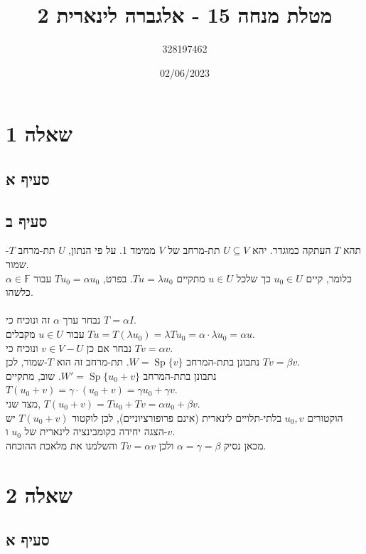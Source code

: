 \documentclass{article}
\title{מטלת מנחה 15 - אלגברה לינארית 2}
\author{328197462}
\date{02/06/2023}
\def\field{\mathbb{F}}
\DeclareMathOperator{\Sp}{Sp}
\begin{document}
\maketitle

\section*{שאלה 1}

\subsection*{סעיף א}

\subsection*{סעיף ב}

תהא $T$ העתקה כמוגדר.
יהא $U\subseteq V$ תת-מרחב של $V$ ממימד 1. על פי הנתון, $U$ תת-מרחב $T$-שמור. \\
כלומר, קיים $u_0\in U$ כך שלכל $u\in U$ מתקיים $Tu=\lambda u_0$. בפרט, $Tu_0=\alpha u_0$ עבור $\alpha\in \field$ כלשהו.\\\\
נבחר ערך $\alpha$ זה ונוכיח כי $T=\alpha I$. \\
עבור $u\in U$ מקבלים $Tu=T(\lambda u_0)= \lambda Tu_0 = \alpha \cdot \lambda u_0=\alpha u$. \\
נבחר אם כן $v\in V - U$ ונוכיח כי $Tv=\alpha v$. \\
נתבונן בתת-המרחב $W=\Sp\{v\}$. תת-מרחב זה הוא $T$-שמור, לכן $Tv=\beta v$. \\
נתבונן בתת-המרחב $W'=\Sp\{ u_0+v \}$. שוב, מתקיים $T(u_0+v)=\gamma \cdot (u_0+v)=\gamma u_0+\gamma v$.\\
מצד שני, $T(u_0+v)=Tu_0+Tv=\alpha u_0 + \beta v$. \\
הוקטורים $u_0,v$ בלתי-תלויים לינארית (אינם פרופורציוניים), לכן לוקטור $T(u_0+v)$ יש הצגה יחידה כקומבינציה לינארית של $u_0$ ו-$v$. \\
מכאן נסיק $\alpha=\gamma=\beta$ ולכן $Tv=\alpha v$ והשלמנו את מלאכת ההוכחה.

\pagebreak

\section*{שאלה 2}

\subsection*{סעיף א}
\end{document}
